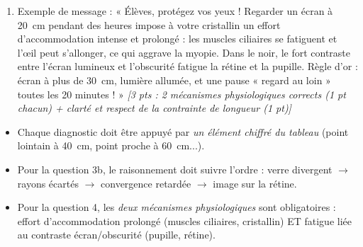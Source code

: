 \documentclass[11pt]{article}
\begin{document}
\begin{corrige}
\begin{enumerate}
\begin{enumerate}
\end{enumerate}
\hfill \emph{[3 pts : 1 pt par sous-question]}
\item Exemple de message : « Élèves, protégez vos yeux ! Regarder un écran à \SI{20}{cm} pendant des heures impose à votre cristallin un effort d'accommodation intense et prolongé : les muscles ciliaires se fatiguent et l'œil peut s'allonger, ce qui aggrave la myopie. Dans le noir, le fort contraste entre l'écran lumineux et l'obscurité fatigue la rétine et la pupille. Règle d'or : écran à plus de \SI{30}{cm}, lumière allumée, et une pause « regard au loin » toutes les 20 minutes ! » \hfill \emph{[3 pts : 2 mécanismes physiologiques corrects (1 pt chacun) + clarté et respect de la contrainte de longueur (1 pt)]}
\end{enumerate}
\end{corrige}

\begin{attention}
\begin{itemize}
\item Chaque diagnostic doit être appuyé par \emph{un élément chiffré du tableau} (point lointain à \SI{40}{cm}, point proche à \SI{60}{cm}...).
\item Pour la question 3b, le raisonnement doit suivre l'ordre : verre divergent $\rightarrow$ rayons écartés $\rightarrow$ convergence retardée $\rightarrow$ image sur la rétine.
\item Pour la question 4, les \emph{deux mécanismes physiologiques} sont obligatoires : effort d'accommodation prolongé (muscles ciliaires, cristallin) ET fatigue liée au contraste écran/obscurité (pupille, rétine).
\end{itemize}
\end{attention}
\end{document}
